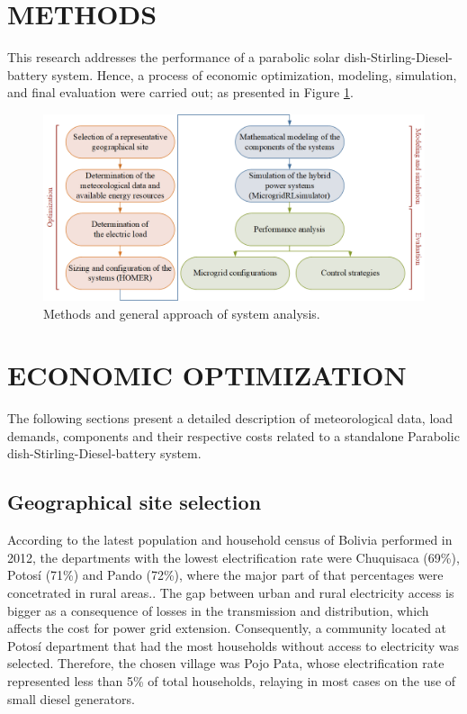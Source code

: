 \documentclass{ECOS_2019}
\begin{document}
\section{METHODS}
This research addresses the performance of a parabolic solar dish-Stirling-Diesel-battery system. Hence, a process of economic optimization, modeling, simulation, and final evaluation were carried out; as presented in Figure \ref{fig_methods}.
\begin{figure}[h!]
    \centering
    \includegraphics[scale=0.618]{Figures/Methodology.png}
    \caption{Methods and general approach of system analysis.}
    \label{fig_methods}
\end{figure}
\section{ECONOMIC OPTIMIZATION}
The following sections present a detailed description of meteorological data, load demands, components and their respective costs related to a standalone Parabolic dish-Stirling-Diesel-battery system.
\subsection{Geographical site selection}
According to the latest population and household census of Bolivia performed in 2012, the departments with the lowest electrification rate were Chuquisaca (69\%), Potosí (71\%) and Pando (72\%), where the major part of that percentages were concetrated in rural areas.\cite{InstitutoNacionaldeEstadistica2012}. The gap between urban and rural electricity access is bigger as a consequence of losses in the transmission and distribution, which affects the cost for power grid extension\cite{Branisa2016}. Consequently, a community located at Potosí department that had the most households without access to electricity was selected. Therefore, the chosen village was Pojo Pata, whose electrification rate represented less than 5\% of total households, relaying in most cases on the use of small diesel generators\cite{InstitutoNacionaldeEstadistica2012}.
\end{document}
